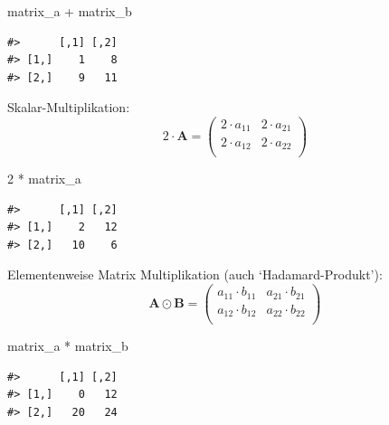 \documentclass[]{tufte-book}
\newenvironment{Shaded}{}{}
\newcommand{\DecValTok}[1]{\textcolor[rgb]{0.25,0.63,0.44}{#1}}
\newcommand{\StringTok}[1]{\textcolor[rgb]{0.25,0.44,0.63}{#1}}
\newcommand{\OperatorTok}[1]{\textcolor[rgb]{0.40,0.40,0.40}{#1}}
\newcommand{\NormalTok}[1]{#1}
\begin{document}
\begin{Shaded}
\begin{Highlighting}[]
\NormalTok{matrix_a }\OperatorTok{+}\StringTok{ }\NormalTok{matrix_b}
\end{Highlighting}
\end{Shaded}

\begin{verbatim}
#>      [,1] [,2]
#> [1,]    1    8
#> [2,]    9   11
\end{verbatim}

Skalar-Multiplikation: \[2\cdot\boldsymbol{A}=
\left( 
\begin{array}{rrr}                                
2\cdot a_{11} & 2\cdot a_{21} \\                                               
2\cdot a_{12} & 2\cdot a_{22} \\                                               
\end{array}
\right)\]

\begin{Shaded}
\begin{Highlighting}[]
\DecValTok{2} \OperatorTok{*}\StringTok{ }\NormalTok{matrix_a}
\end{Highlighting}
\end{Shaded}

\begin{verbatim}
#>      [,1] [,2]
#> [1,]    2   12
#> [2,]   10    6
\end{verbatim}

Elementenweise Matrix Multiplikation (auch `Hadamard-Produkt'):
\[\boldsymbol{A}\odot\boldsymbol{B}=
\left(
\begin{array}{rrr}                                
a_{11}\cdot b_{11} & a_{21}\cdot b_{21}\\                                               
a_{12}\cdot b_{12} & a_{22}\cdot b_{22}\\                                               
\end{array}
\right)\]

\begin{Shaded}
\begin{Highlighting}[]
\NormalTok{matrix_a }\OperatorTok{*}\StringTok{ }\NormalTok{matrix_b}
\end{Highlighting}
\end{Shaded}

\begin{verbatim}
#>      [,1] [,2]
#> [1,]    0   12
#> [2,]   20   24
\end{verbatim}
\end{document}
